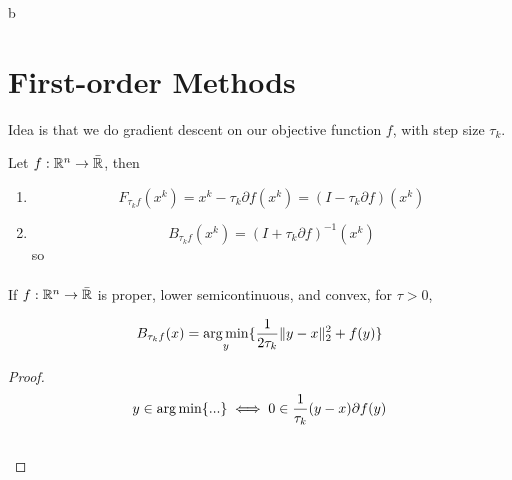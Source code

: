 b\chapter{First-order Methods}
\label{cha:first-order-methods}

Idea is that we do gradient descent on our objective function $f$,
with step size $\tau_{k}$.

\begin{defn}
  \label{defn:first_order_methods:1}
  Let $f: \mathbb{R}^{n} \rightarrow \bar {\mathbb{R}}$, then
  \begin{enumerate}
  \item
    \begin{equation}
      \label{eq:1}
      F_{\tau_{k}f}(x^{k}) = x^{k} - \tau_{k} \partial f(x^{k}) = (I -
      \tau_{k} \partial f)(x^{k})
    \end{equation}
  \item
    \begin{equation}
      \label{eq:2}
      B_{\tau_{k} f}(x^{k}) = (I + \tau_{k} \partial f)^{-1}(x^{k})
    \end{equation} so
    \begin{align}
      \label{eq:3}
    \end{align} 
  \end{enumerate}
\end{defn}

\begin{proposition}
  If $f: \mathbb{R}^{n} \rightarrow \bar {\mathbb{R}}$ is proper, lower semicontinuous,
  and convex, for $\tau > 0$, 

  \begin{equation}
    \label{eq:62}
    B_{\tau_{k} f}(x) = \operatorname*{arg\,min}_{y} \{
    \frac{1}{2\tau_{k}} \| y - x \|_{2}^{2} + f(y) \}
  \end{equation}
\end{proposition}

\begin{proof}
  \begin{align}
    \label{eq:72}
    y \in \operatorname*{arg\,min} \{ ... \} &\iff 0 \in \frac{1}{\tau_{k}}(y -x
    ) \partial f(y) \\
    &\
  \end{align}
\end{proof}



